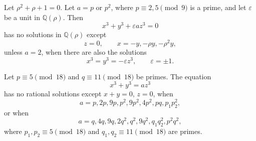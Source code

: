 \begin{proposition}
    Let $\rho^2+\rho+1=0$. Let $a=p$ or $p^2$, where $p\equiv2,5\pmod9$ is a prime, and let $\varepsilon$ be a unit in $\mathbb{Q}(\rho)$. Then
\[
    x^3+y^3+\varepsilon az^3=0
\]
    has no solutions in $\mathbb{Q}(\rho)$ except
\[
    z=0,\qquad x=-y,-\rho y,-\rho^2y,
\]
    unless $a=2$, when there are also the solutions
\[
    x^3=y^3=-\varepsilon z^3,\qquad \varepsilon=\pm1.
\]
\end{proposition}

\begin{proposition}
    Let $p\equiv5\pmod{18}$ and $q\equiv11\pmod{18}$ be primes. The equation
\[
    x^3+y^3=az^3
\]
    has no rational solutions except $x+y=0$, $z=0$, when
\[
    a=p,2p,9p,p^2,9p^2,4p^2,pq,p_1p_2^2,
\]
    or when
\[
    a=q,4q,9q,2q^2,q^2,9q^2,q_1q_2^2,p^2q^2,
\]
    where $p_1,p_2\equiv5\pmod{18}$ and $q_1,q_2\equiv11\pmod{18}$ are primes.
\end{proposition}
